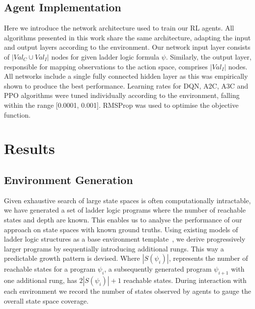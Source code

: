 \documentclass[runningheads]{llncs}
\begin{document}
\subsection{Agent Implementation}
Here we introduce the network architecture used to train our RL agents. All algorithms presented in this work share the same architecture, adapting the input and output layers according to the environment. Our network input layer consists of $|Val_C \cup Val_I|$ nodes for given ladder logic formula $\psi$. Similarly, the output layer, responsible for mapping observations to the action space, comprises $|Val_I|$ nodes. All networks include a single fully connected hidden layer as this was empirically shown to produce the best performance. Learning rates for DQN, A2C, A3C and PPO algorithms were tuned individually according to the environment, falling within the range [0.0001, 0.001]. RMSProp was used to optimise the objective function. 

\section{Results}\label{sec:results}
\subsection{Environment Generation} 
Given exhaustive search of large state spaces is often computationally intractable, we have generated a set of ladder logic programs where the number of reachable states and depth are known. This enables us to analyse the performance of our approach on state spaces with known ground truths. Using existing models of ladder logic structures as a base environment template~\cite{james2013verification}, we derive progressively larger programs by sequentially introducing additional rungs. This way a predictable growth pattern is devised. Where $|S(\psi_i)|$, represents the number of reachable states for a program $\psi_i$, a subsequently generated program $\psi_{i+1}$ with one additional rung, has $2|S(\psi_i)|+1$ reachable states. During interaction with each environment we record the number of states observed by agents to gauge the overall state space coverage.

\end{document}
